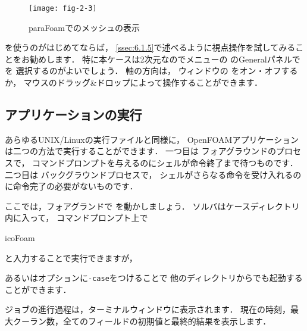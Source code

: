 \begin{figure}[ht]
 \texttt{[image: fig-2-3]}
 \caption{paraFoamでのメッシュの表示}
 \label{fig:2.3}
\end{figure}


を使うのがはじめてならば，
\autoref{ssec:6.1.5}で述べるように視点操作を試してみることをお勧めします．
特に本ケースは2次元なのでメニューの
%
%
のGeneralパネルで
%
%
を
選択するのがよいでしょう．
軸の方向は，
%
%
ウィンドウの
%
%
をオン・オフするか，
マウスのドラッグ\&ドロップによって操作することができます．


\subsection{アプリケーションの実行}
\label{ssec:2.1.3}
あらゆるUNIX/Linuxの実行ファイルと同様に，
OpenFOAMアプリケーションは二つの方法で実行することができます．
一つ目は
%
%
フォアグラウンドのプロセスで，
コマンドプロンプトを与えるのにシェルが命令終了まで待つものです．
二つ目は
%
%
バックグラウンドプロセスで，
シェルがさらなる命令を受け入れるのに命令完了の必要がないものです．

ここでは，フォアグランドで
%
%
を動かしましょう．
ソルバはケースディレクトリ内に入って，
コマンドプロンプト上で
\begin{OFverbatim}[terminal]
icoFoam
\end{OFverbatim}
と入力することで実行できますが，

あるいはオプションに\texttt{-case}をつけることで
他のディレクトリからでも起動することができます．
ジョブの進行過程は，ターミナルウィンドウに表示されます．
現在の時刻，最大クーラン数，全てのフィールドの初期値と最終的結果を表示します．


